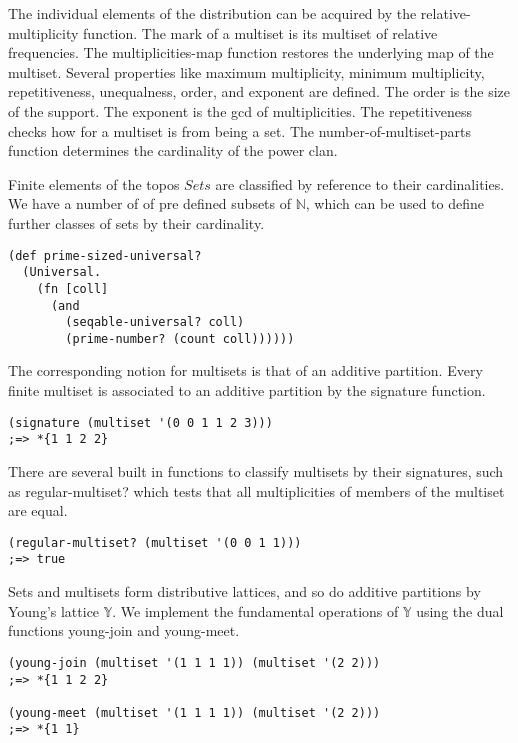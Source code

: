 \documentclass[a4paper,11pt]{report}
\begin{document}
The individual elements of the distribution can be acquired by the relative-multiplicity function. The mark of a multiset is its multiset of relative frequencies. The multiplicities-map function restores the underlying map of the multiset. Several properties like maximum multiplicity, minimum multiplicity, repetitiveness, unequalness, order, and exponent are defined. The order is the size of the support. The exponent is the gcd of multiplicities. The repetitiveness checks how for a multiset is from being a set. The number-of-multiset-parts function determines the cardinality of the power clan.

\newpage 

Finite elements of the topos $Sets$ are classified by reference to their cardinalities. We have a number of of pre defined subsets of $\mathbb{N}$, which can be used to define further classes of sets by their cardinality.

\lstset {language=Lisp}
\begin{lstlisting}
(def prime-sized-universal?
  (Universal. 
    (fn [coll] 
      (and 
        (seqable-universal? coll)
        (prime-number? (count coll))))))
\end{lstlisting}

The corresponding notion for multisets is that of an additive partition. Every finite multiset is associated to an additive partition by the signature function.

\lstset {language=Lisp}
\begin{lstlisting}
(signature (multiset '(0 0 1 1 2 3)))
;=> *{1 1 2 2}
\end{lstlisting}

There are several built in functions to classify multisets by their signatures, such as regular-multiset? which tests that all multiplicities of members of the multiset are equal.

\lstset {language=Lisp}
\begin{lstlisting}
(regular-multiset? (multiset '(0 0 1 1)))
;=> true
\end{lstlisting}

Sets and multisets form distributive lattices, and so do additive partitions by Young's lattice $\mathbb{Y}$. We implement the fundamental operations of $\mathbb{Y}$ using the dual functions young-join and young-meet.

\lstset {language=Lisp}
\begin{lstlisting}
(young-join (multiset '(1 1 1 1)) (multiset '(2 2)))
;=> *{1 1 2 2}

(young-meet (multiset '(1 1 1 1)) (multiset '(2 2)))
;=> *{1 1}
\end{lstlisting}
\end{document}
